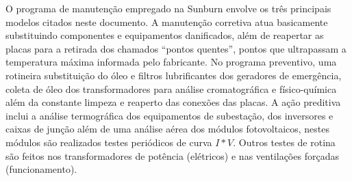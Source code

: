 O programa de manutenção empregado na Sunburn envolve os três principais modelos citados neste documento. A manutenção corretiva atua basicamente substituindo componentes e equipamentos danificados, além de reapertar as placas para a retirada dos chamados ``pontos quentes'', pontos que ultrapassam a temperatura máxima informada pelo fabricante. No programa preventivo, uma rotineira substituição do óleo e filtros lubrificantes dos geradores de emergência, coleta de óleo dos transformadores para análise cromatográfica e físico-química além da constante limpeza e reaperto das conexões das placas. A ação preditiva inclui a análise termográfica dos equipamentos de subestação, dos inversores e caixas de junção além de uma análise aérea dos módulos fotovoltaicos, nestes módulos são realizados testes periódicos de curva $I * V$. Outros testes de rotina são feitos nos transformadores de potência (elétricos) e nas ventilações forçadas (funcionamento).